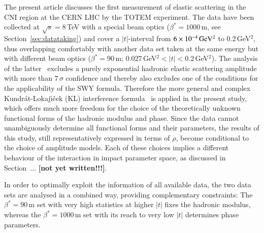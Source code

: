 The present article discusses the first measurement of elastic scattering in the
CNI region at the CERN LHC by the TOTEM experiment. 
The data have been collected at $\sqrt{s} = 8\,$TeV with a special beam optics 
($\beta^{*}=1000\,$m, see Section~\ref{sec:datataking}) and cover a $|t|$-interval
from $6\times10^{-4}\,\rm GeV^{2}$ to 0.2\,GeV$^{2}$, thus overlapping comfortably
with another data set taken at the same energy but with different beam optics
($\beta^{*}=90\,$m; 0.027\,GeV$^{2} < |t| < 0.2\,$GeV$^{2}$). The analysis of the
latter~\cite{8tev-90m} excludes a purely exponential hadronic elastic scattering
amplitude with more than $7\,\sigma$ confidence and thereby also excludes
one of the conditions for the applicability of the SWY formula.
Therefore the more general and complex Kundr\'{a}t-Lokaj\'{\i}\v{c}ek (KL) interference 
formula~\cite{kl94} is applied in the present study, which offers much more freedom for the
choice of the theoretically unknown functional forms of the hadronic modulus 
and phase. Since the data cannot unambiguously determine all functional forms and their parameters, the results of this study, still representatively 
expressed in terms of $\rho$, become conditional to the choice of amplitude models. Each of these choices implies a different behaviour of the interaction in impact parameter space, as discussed in Section~...
\textbf{[not yet written!!!]}.

In order to optimally exploit the information of all available data, the two 
data sets are analysed in a combined way, providing complementary constraints:
The $\beta^{*}=90\,$m set with very high statistics at higher $|t|$ fixes the 
hadronic modulus, whereas the $\beta^{*}=1000\,$m set with its reach to very low
$|t|$ determines phase parameters.




%
%
